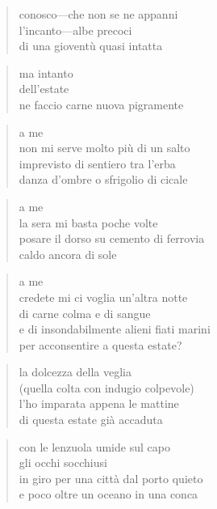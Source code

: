 \begin{verse}
    conosco—che non se ne appanni\\
    l’incanto—albe precoci\\
    di una gioventù quasi intatta
\end{verse}

\begin{verse}
    ma intanto\\
    dell’estate\\
    ne faccio carne nuova
    pigramente
\end{verse}

\clearpage


\begin{verse}
    a me\\
    non mi serve molto più di un salto\\
    imprevisto di sentiero tra l'erba\\
    danza d'ombre o sfrigolio di cicale
\end{verse}

\begin{verse}
    a me\\
    la sera mi basta poche volte\\
    posare il dorso su cemento di ferrovia\\
    caldo ancora di sole
\end{verse}

\begin{verse}
    a me\\
    credete mi ci voglia un'altra notte\\
    di carne colma e di sangue\\
    e di insondabilmente alieni fiati marini\\
    per acconsentire a questa estate?
\end{verse}

\clearpage


\begin{verse}
    la dolcezza della veglia\\
    (quella colta con indugio colpevole)\\
    l'ho imparata appena le mattine\\
    di questa estate già accaduta
\end{verse}

\begin{verse}
    con le lenzuola umide sul capo\\
    gli occhi socchiusi\\
    in giro per una città dal porto quieto\\
    e poco oltre un oceano in una conca
\end{verse}

